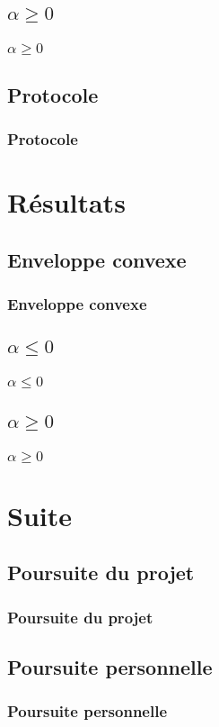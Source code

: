 \documentclass{beamer}
\begin{document}
\subsection{$\alpha \geq 0$}
\begin{frame}
\frametitle{$\alpha \geq 0$}
\end{frame}

\subsection{Protocole}
\begin{frame}
\frametitle{Protocole}
\end{frame}

\section{Résultats}

\subsection{Enveloppe convexe}
\begin{frame}
\frametitle{Enveloppe convexe}
\end{frame}

\subsection{$\alpha \leq 0$}
\begin{frame}
\frametitle{$\alpha \leq 0$}
\end{frame}

\subsection{$\alpha \geq 0$}
\begin{frame}
\frametitle{$\alpha \geq 0$}
\end{frame}

\section{Suite}

\subsection{Poursuite du projet}
\begin{frame}
\frametitle{Poursuite du projet}
\end{frame}

\subsection{Poursuite personnelle}
\begin{frame}
\frametitle{Poursuite personnelle}
\end{frame}

\end{document}
